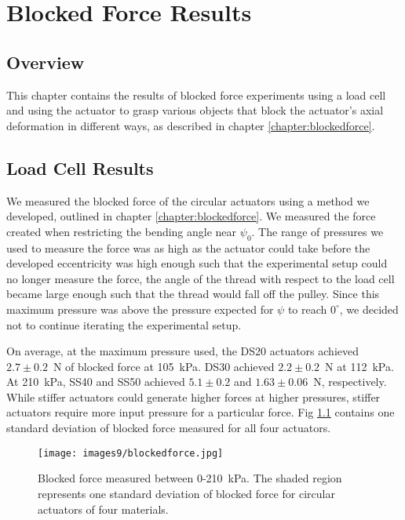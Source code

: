 \chapter{Blocked Force Results}

\section*{Overview}

This chapter contains the results of blocked force experiments using a load cell and using the actuator to grasp various objects that block the actuator's axial deformation in different ways, as described in chapter \ref{chapter:blockedforce}. 

\section{Load Cell Results}

We measured the blocked force of the circular actuators using a method we developed, outlined in chapter \ref{chapter:blockedforce}. We measured the force created when restricting the bending angle near $\psi_0$. The range of pressures we used to measure the force was as high as the actuator could take before the developed eccentricity was high enough such that the experimental setup could no longer measure the force, the angle of the thread with respect to the load cell became large enough such that the thread would fall off the pulley. Since this maximum pressure was above the pressure expected for $\psi$ to reach $0^\circ$, we decided not to continue iterating the experimental setup. 

On average, at the maximum pressure used, the DS20 actuators achieved $2.7\pm0.2$~N of blocked force at 105~kPa. DS30 achieved $2.2\pm0.2$~N at 112~kPa. At 210~kPa, SS40 and SS50 achieved $5.1\pm0.2$ and $1.63\pm0.06$~N, respectively. While stiffer actuators could generate higher forces at higher pressures, stiffer actuators require more input pressure for a particular force. Fig \ref{fig:blockedforce} contains one standard deviation of blocked force measured for all four actuators. 

\begin{figure}[!ht]
    \centering
     \texttt{[image: images9/blockedforce.jpg]}
    \caption{Blocked force measured between 0-210~kPa. The shaded region represents one standard deviation of blocked force for circular actuators of four materials.}
    \label{fig:blockedforce}
\end{figure}

